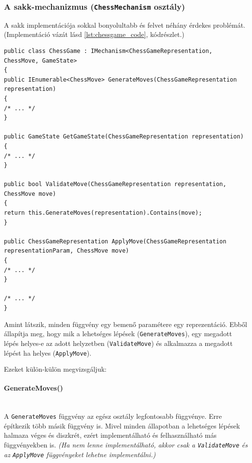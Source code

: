 \documentclass[twoside, a4paper, 12pt]{article}
\begin{document}
\subsubsection{A sakk-mechanizmus (\texttt{ChessMechanism} osztály)}

A sakk implementációja sokkal bonyolultabb és felvet néhány érdekes problémát. (Implementáció vázát lásd \ref{lst:chessgame_code}, kódrészlet.)

\begin{lstlisting}[caption=Sakk szabályok implementációja, label=lst:chessgame_code]
public class ChessGame : IMechanism<ChessGameRepresentation, ChessMove, GameState>
{
public IEnumerable<ChessMove> GenerateMoves(ChessGameRepresentation representation)
{ 
/* ... */ 
}

public GameState GetGameState(ChessGameRepresentation representation)
{ 
/* ... */ 
}

public bool ValidateMove(ChessGameRepresentation representation, ChessMove move)
{
return this.GenerateMoves(representation).Contains(move);
}

public ChessGameRepresentation ApplyMove(ChessGameRepresentation representationParam, ChessMove move)
{ 
/* ... */ 
}

/* ... */
}
\end{lstlisting}

Amint látszik, minden függvény egy bemenő paramétere egy reprezentáció. Ebből állapítja meg, hogy mik a lehetséges lépések (\texttt{GenerateMoves}), egy megadott lépés helyes-e az adott helyzetben (\texttt{ValidateMove}) és alkalmazza a megadott lépést ha helyes (\texttt{ApplyMove}).

Ezeket külön-külön megvizsgáljuk:

\paragraph{GenerateMoves()} \mbox{} \\
A \texttt{GenerateMoves} függvény az egész osztály legfontosabb függvénye. Erre építkezik több másik függvény is. Mivel minden állapotban a lehetséges lépések halmaza véges és diszkrét, ezért implementálható és felhasználható más függvényekben is. \textit{(Ha nem lenne implementálható, akkor csak a \texttt{ValidateMove} és az \texttt{ApplyMove} függvényeket lehetne implementálni.)}
\end{document}
